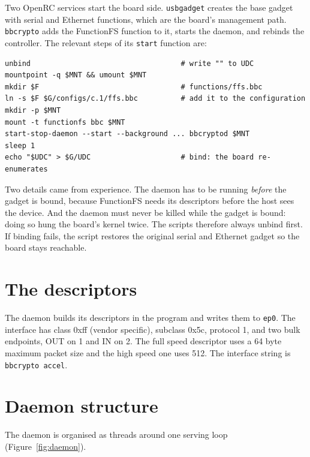 \documentclass[11pt,a4paper,oneside]{report}
\newcommand{\code}[1]{\texttt{\small #1}}
\begin{document}
Two OpenRC services start the board side. \code{usbgadget} creates the base gadget with serial and Ethernet functions, which are the board's management path. \code{bbcrypto} adds the FunctionFS function to it, starts the daemon, and rebinds the controller. The relevant steps of its \code{start} function are:

\begin{lstlisting}[style=shell]
unbind                                   # write "" to UDC
mountpoint -q $MNT && umount $MNT
mkdir $F                                 # functions/ffs.bbc
ln -s $F $G/configs/c.1/ffs.bbc          # add it to the configuration
mkdir -p $MNT
mount -t functionfs bbc $MNT
start-stop-daemon --start --background ... bbcryptod $MNT
sleep 1
echo "$UDC" > $G/UDC                     # bind: the board re-enumerates
\end{lstlisting}

Two details came from experience. The daemon has to be running \emph{before} the gadget is bound, because FunctionFS needs its descriptors before the host sees the device. And the daemon must never be killed while the gadget is bound: doing so hung the board's kernel twice. The scripts therefore always unbind first. If binding fails, the script restores the original serial and Ethernet gadget so the board stays reachable.

\section{The descriptors}

The daemon builds its descriptors in the program and writes them to \code{ep0}. The interface has class 0xff (vendor specific), subclass 0x5c, protocol 1, and two bulk endpoints, OUT on 1 and IN on 2. The full speed descriptor uses a 64 byte maximum packet size and the high speed one uses 512. The interface string is \code{bbcrypto accel}.

\section{Daemon structure}

The daemon is organised as threads around one serving loop (Figure~\ref{fig:daemon}).
\end{document}
